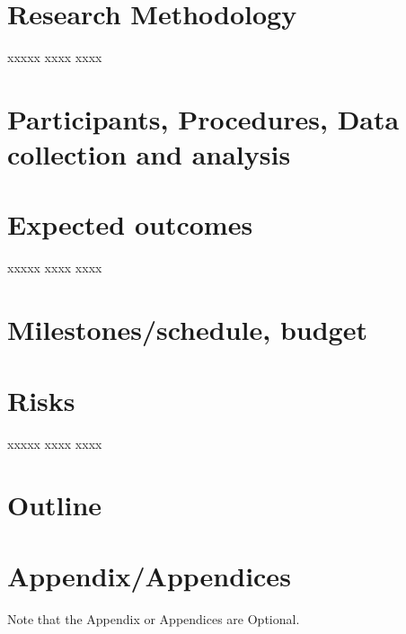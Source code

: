 \documentclass[12pt,twoside,english]{article}
\begin{document}
\section{Research Methodology}
\label{sec:method}

xxxxx xxxx xxxx 

\section{Participants, Procedures, Data collection and analysis}
\label{sec:sourcesOfData}

\section{Expected outcomes}
\label{sec:expectedOutcomes}

xxxxx xxxx xxxx 
\section {Milestones/schedule, budget}
\label{sec:milestones}

\section{Risks}

xxxxx xxxx xxxx 

\section{Outline}



\appendix
\section{Appendix/Appendices}

Note that the Appendix or Appendices are Optional.
\end{document}
